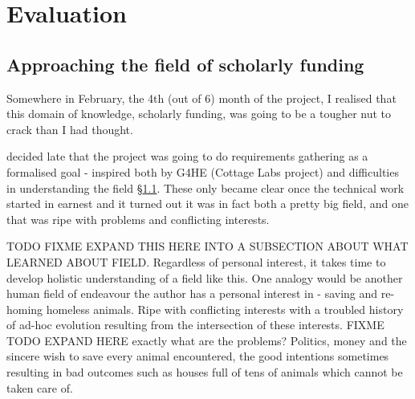 \chapter{Evaluation}




\section{Approaching the field of scholarly funding}
\label{eval-difficult-field}
Somewhere in February, the 4th (out of 6) month of the project, I realised that this domain of knowledge, scholarly funding, was going to be a tougher nut to crack than I had thought.

decided late that the project was going to do requirements gathering as a formalised goal - inspired both by G4HE (Cottage Labs project) and difficulties in understanding the field \S\ref{eval-difficult-field}. These only became clear once the technical work started in earnest and it turned out it was in fact both a pretty big field, and one that was ripe with problems and conflicting interests.

TODO FIXME EXPAND THIS HERE INTO A SUBSECTION ABOUT WHAT LEARNED ABOUT FIELD. Regardless of personal interest, it takes time to develop holistic understanding of a field like this. One analogy would be another human field of endeavour the author has a personal interest in - saving and re-homing homeless animals. Ripe with conflicting interests with a troubled history of ad-hoc evolution resulting from the intersection of these interests. FIXME TODO EXPAND HERE exactly what are the problems? Politics, money and the sincere wish to save every animal encountered, the good intentions sometimes resulting in bad outcomes 
such as houses full of tens of animals which cannot be taken care of.

